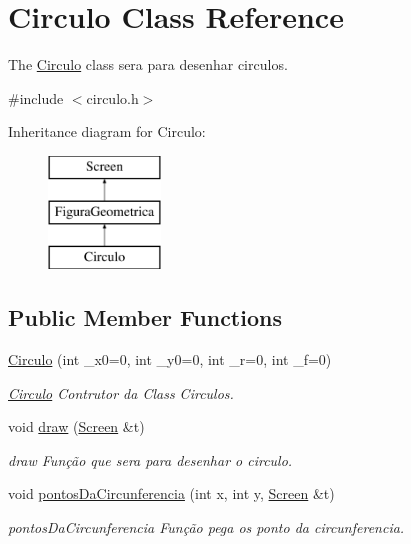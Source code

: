 \hypertarget{class_circulo}{}\section{Circulo Class Reference}
\label{class_circulo}


The \mbox{\hyperlink{class_circulo}{Circulo}} class sera para desenhar circulos.  




{\ttfamily \#include $<$circulo.\+h$>$}

Inheritance diagram for Circulo\+:\begin{figure}[H]
\begin{center}
\leavevmode
\includegraphics[height=3.000000cm]{class_circulo}
\end{center}
\end{figure}
\subsection*{Public Member Functions}
\begin{DoxyCompactItemize}
\item 
\mbox{\hyperlink{class_circulo_adbc97608526f737c01fd5f0e1fdd515b}{Circulo}} (int \+\_\+x0=0, int \+\_\+y0=0, int \+\_\+r=0, int \+\_\+f=0)
\begin{DoxyCompactList}\small\item\em \mbox{\hyperlink{class_circulo}{Circulo}} Contrutor da Class Circulos. \end{DoxyCompactList}\item 
void \mbox{\hyperlink{class_circulo_a593787d6e0618c2eded23e8839e7bea6}{draw}} (\mbox{\hyperlink{class_screen}{Screen}} \&t)
\begin{DoxyCompactList}\small\item\em draw Função que sera para desenhar o circulo. \end{DoxyCompactList}\item 
void \mbox{\hyperlink{class_circulo_a883509c096bf9c9332d749d749168c19}{pontos\+Da\+Circunferencia}} (int x, int y, \mbox{\hyperlink{class_screen}{Screen}} \&t)
\begin{DoxyCompactList}\small\item\em pontos\+Da\+Circunferencia Função pega os ponto da circunferencia. \end{DoxyCompactList}\end{DoxyCompactItemize}


